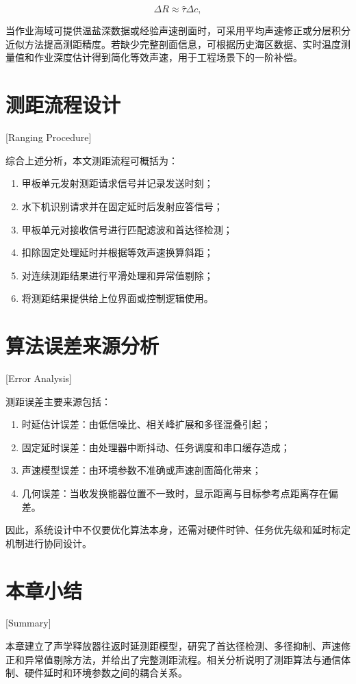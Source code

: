 \begin{equation}
  \Delta R \approx \hat{\tau} \Delta c,
  \label{eq:sound_speed_error}
\end{equation}

当作业海域可提供温盐深数据或经验声速剖面时，可采用平均声速修正或分层积分近似方法提高测距精度\cite{ChenHongXiaLuLianGangHuaFengFanBinLiuNuoFangJunWeiSanZhongChangYongShengSuSuanFaDeBiJiao2005,ZhaoDiNengShengSuPouMianJingJianYunSuanDeGaiJinDPSuanFaJiQiPingGu2014}。若缺少完整剖面信息，可根据历史海区数据、实时温度测量值和作业深度估计得到简化等效声速，用于工程场景下的一阶补偿。

\section{测距流程设计}[Ranging Procedure]

综合上述分析，本文测距流程可概括为：

\begin{enumerate}
  \item 甲板单元发射测距请求信号并记录发送时刻；
  \item 水下机识别请求并在固定延时后发射应答信号；
  \item 甲板单元对接收信号进行匹配滤波和首达径检测；
  \item 扣除固定处理延时并根据等效声速换算斜距；
  \item 对连续测距结果进行平滑处理和异常值剔除；
  \item 将测距结果提供给上位界面或控制逻辑使用。
\end{enumerate}

\section{算法误差来源分析}[Error Analysis]

测距误差主要来源包括：

\begin{enumerate}
  \item 时延估计误差：由低信噪比、相关峰扩展和多径混叠引起；
  \item 固定延时误差：由处理器中断抖动、任务调度和串口缓存造成；
  \item 声速模型误差：由环境参数不准确或声速剖面简化带来；
  \item 几何误差：当收发换能器位置不一致时，显示距离与目标参考点距离存在偏差。
\end{enumerate}

因此，系统设计中不仅要优化算法本身，还需对硬件时钟、任务优先级和延时标定机制进行协同设计。

\section*{本章小结}[Summary]

本章建立了声学释放器往返时延测距模型，研究了首达径检测、多径抑制、声速修正和异常值剔除方法，并给出了完整测距流程。相关分析说明了测距算法与通信体制、硬件延时和环境参数之间的耦合关系。
